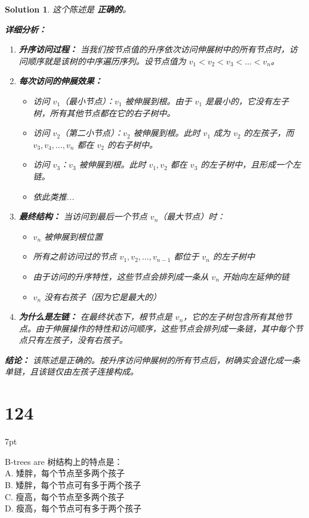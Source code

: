 \documentclass[UTF8]{report}
\newtheorem{solution}{Solution}
\theoremstyle{MyLineTheoremStyle} %
\theoremstyle{MyBlockTheoremStyle} %
\theoremstyle{MySubsubsectionStyle} %
\newenvironment{graybox}{%
        \def\FrameCommand{%
        \hspace{1pt}%
        {\color{gray}\small \vrule width 2pt}%
        {\color{graybox_color}\vrule width 4pt}%
        \colorbox{graybox_color}%
        }%
        \MakeFramed{\advance\hsize-\width\FrameRestore}%
        \noindent\hspace{-4.55pt}%
        \begin{adjustwidth}{}{7pt}%
        \vspace{2pt}\vspace{2pt}%
        }
        {%
        \vspace{2pt}\end{adjustwidth}\endMakeFramed%
        }
\begin{document}
\begin{solution}
这个陈述是 \textbf{正确的}。

\textbf{详细分析：}

\begin{enumerate}
    \item \textbf{升序访问过程：}
    当我们按节点值的升序依次访问伸展树中的所有节点时，访问顺序就是该树的中序遍历序列。设节点值为 $v_1 < v_2 < v_3 < \ldots < v_n$。

    \item \textbf{每次访问的伸展效果：}
    \begin{itemize}
        \item 访问 $v_1$（最小节点）：$v_1$ 被伸展到根。由于 $v_1$ 是最小的，它没有左子树，所有其他节点都在它的右子树中。
        \item 访问 $v_2$（第二小节点）：$v_2$ 被伸展到根。此时 $v_1$ 成为 $v_2$ 的左孩子，而 $v_3, v_4, \ldots, v_n$ 都在 $v_2$ 的右子树中。
        \item 访问 $v_3$：$v_3$ 被伸展到根。此时 $v_1, v_2$ 都在 $v_3$ 的左子树中，且形成一个左链。
        \item 依此类推...
    \end{itemize}

    \item \textbf{最终结构：}
    当访问到最后一个节点 $v_n$（最大节点）时：
    \begin{itemize}
        \item $v_n$ 被伸展到根位置
        \item 所有之前访问过的节点 $v_1, v_2, \ldots, v_{n-1}$ 都位于 $v_n$ 的左子树中
        \item 由于访问的升序特性，这些节点会排列成一条从 $v_n$ 开始向左延伸的链
        \item $v_n$ 没有右孩子（因为它是最大的）
    \end{itemize}

    \item \textbf{为什么是左链：}
    在最终状态下，根节点是 $v_n$，它的左子树包含所有其他节点。由于伸展操作的特性和访问顺序，这些节点会排列成一条链，其中每个节点只有左孩子，没有右孩子。
\end{enumerate}

\textbf{结论：}
该陈述是正确的。按升序访问伸展树的所有节点后，树确实会退化成一条单链，且该链仅由左孩子连接构成。
\end{solution}


\section*{124}
\begin{graybox}
B-trees are 树结构上的特点是：\\
A. 矮胖，每个节点至多两个孩子\\
B. 矮胖，每个节点可有多于两个孩子\\
C. 瘦高，每个节点至多两个孩子\\
D. 瘦高，每个节点可有多于两个孩子
\end{graybox}
\end{document}
